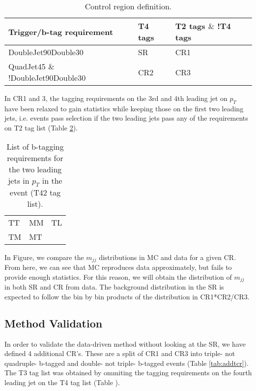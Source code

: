 \begin{table}[hbtp]\footnotesize
	\centering
	\begin{tabular}{l l l}
		\hline
		\textbf{Trigger/b-tag requirement} & T4 tags & T2 tags $\&$ !T4 tags \\
		\hline
		DoubleJet90Double30 & SR & CR1 \\
		QuadJet45 $\&$!DoubleJet90Double30 & CR2 & CR3 \\
		\hline
	\end{tabular}
	\caption{Control region definition.}
	\label{tab:srcr}
\end{table}

In CR1 and 3, the tagging requirements on the 3rd and 4th leading jet on $p_{T}$ have been relaxed to gain statistics while keeping those on the first two leading jets, i.e. events pass selection if the two leading jets pass any of the requirements on T2 tag list (Table \ref{tab:t2tag}).

\begin{table}[hbtp]\footnotesize
	\centering
	\begin{tabular}{l|l|l}
		\hline
		TT & MM & TL\\
		TM & MT & \\
		\hline
	\end{tabular}
	\caption{List of b-tagging requirements for the two leading jets in $p_{T}$ in the event (T42 tag list).}
	\label{tab:t2tag}
\end{table}

In Figure, we compare the $m_{jj}$ distributions in MC and data for a given CR. From here, we can see that MC reproduces data approximately, but fails to provide enough statistics. For this reason, we will obtain the distribution of $m_{jj}$ in both SR and CR from data. The background distribution in the SR is expected to follow the bin by bin products of the distribution in CR1*CR2/CR3.

\subsection{Method Validation}

In order to validate the data-driven method without looking at the SR, we have defined 4 additional CR's. These are a split of CR1 and CR3 into triple- not quadruple- b-tagged and double- not triple- b-tagged events (Table \ref{tab:addtcr}). The T3 tag list was obtained by ommiting the tagging requirements on the fourth leading jet on the T4 tag list (Table ).

